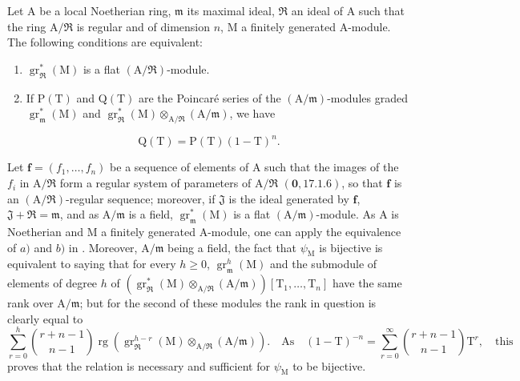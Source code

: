 \begin{corollary}[19.7.3]
\label{IV.19.7.3}
Let $\mathrm{A}$ be a local Noetherian ring, $\mathfrak{m}$ its maximal ideal, $\mathfrak{R}$ an ideal of $\mathrm{A}$ such that the ring $\mathrm{A}/\mathfrak{R}$ is regular and of dimension $n$, $\mathrm{M}$ a finitely generated $\mathrm{A}$-module. The following conditions are equivalent:
\begin{enumerate}
\item[\rm a)] $\operatorname{gr}_\mathfrak{R}^*(\mathrm{M})$ is a flat $(\mathrm{A}/\mathfrak{R})$-module.
\item[\rm b)] If $\mathrm{P}(\mathrm{T})$ and $\mathrm{Q}(\mathrm{T})$ are the Poincar\'e series of the $(\mathrm{A}/\mathfrak{m})$-modules graded $\operatorname{gr}_\mathfrak{m}^*(\mathrm{M})$ and $\operatorname{gr}_\mathfrak{R}^*(\mathrm{M})\otimes_{\mathrm{A}/\mathfrak{R}}(\mathrm{A}/\mathfrak{m})$, we have
\end{enumerate}
\begin{equation}
  \mathrm{Q}(\mathrm{T})=\mathrm{P}(\mathrm{T})(1-\mathrm{T})^n.
  \tag{19.7.3.1}
\end{equation}

Let $\mathbf{f}=(f_1,\ldots,f_n)$ be a sequence of elements of $\mathrm{A}$ such that the images of the $f_i$ in $\mathrm{A}/\mathfrak{R}$ form a regular system of parameters of $\mathrm{A}/\mathfrak{R}$ $(\mathbf{0},17.1.6)$, so that $\mathbf{f}$ is an $(\mathrm{A}/\mathfrak{R})$-regular sequence; moreover, if $\mathfrak{J}$ is the ideal generated by $\mathbf{f}$, $\mathfrak{J}+\mathfrak{R}=\mathfrak{m}$, and as $\mathrm{A}/\mathfrak{m}$ is a field, $\operatorname{gr}_\mathfrak{m}^*(\mathrm{M})$ is a flat $(\mathrm{A}/\mathfrak{m})$-module. As $\mathrm{A}$ is Noetherian and $\mathrm{M}$ a finitely generated $\mathrm{A}$-module, one can apply the equivalence of $a)$ and $b)$ in . Moreover, $\mathrm{A}/\mathfrak{m}$ being a field, the fact that $\psi_\mathrm{M}$ is bijective is equivalent to saying that for every $h\geqslant 0$, $\operatorname{gr}_\mathfrak{m}^h(\mathrm{M})$ and the submodule of elements of degree $h$ of $(\operatorname{gr}_\mathfrak{R}^*(\mathrm{M})\otimes_{\mathrm{A}/\mathfrak{R}}(\mathrm{A}/\mathfrak{m}))[\mathrm{T}_1,\ldots,\mathrm{T}_n]$ have the same rank over $\mathrm{A}/\mathfrak{m}$; but for the second of these modules the rank in question is clearly equal to
\[
  \textstyle\sum_{r=0}^{h}\binom{r+n-1}{n-1}\operatorname{rg}(\operatorname{gr}_\mathfrak{R}^{h-r}(\mathrm{M})\otimes_{\mathrm{A}/\mathfrak{R}}(\mathrm{A}/\mathfrak{m})).\quad\text{As}\quad(1-\mathrm{T})^{-n}=\textstyle\sum_{r=0}^{\infty}\binom{r+n-1}{n-1}\mathrm{T}^r,\quad\text{this}
\]
proves that the relation  is necessary and sufficient for $\psi_\mathrm{M}$ to be bijective.
\end{corollary}

